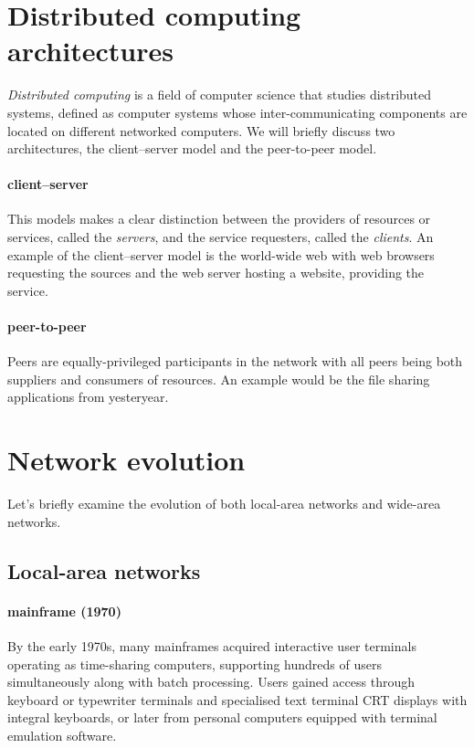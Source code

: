 \section{Distributed computing architectures}

\emph{Distributed computing} is a field of computer science that studies distributed systems, defined as computer systems whose inter-communicating components are located on different networked computers.
We will briefly discuss two architectures, the client--server model and the peer-to-peer model.

\paragraph{client--server}
This models makes a clear distinction between the providers of resources or services, called the \emph{servers}, and the service requesters, called the \emph{clients}.
An example of the client--server model is the world-wide web with web browsers requesting the sources and the web server hosting a website, providing the service.

\paragraph{peer-to-peer}
Peers are equally-privileged participants in the network with all peers being both suppliers and consumers of resources.
An example would be the file sharing applications from yesteryear.




\section{Network evolution}
\label{sec:network-evolution}

Let's briefly examine the evolution of both local-area networks and wide-area networks.

\subsection{Local-area networks}
\label{sec:network-evolution-lan}

\paragraph{mainframe (1970)}%
By the early 1970s, many mainframes acquired interactive user terminals operating as time-sharing computers, supporting hundreds of users simultaneously along with batch processing.
Users gained access through keyboard or typewriter terminals%
and specialised text terminal \gls{CRT} displays with integral keyboards, or later from personal computers equipped with terminal emulation software.

